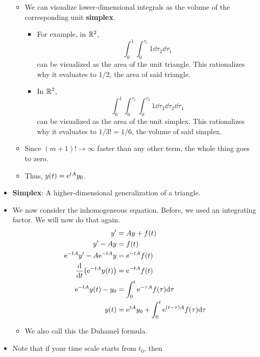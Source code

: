 \documentclass[../notes.tex]{subfiles}
\begin{document}
\begin{itemize}
\begin{itemize}
\begin{itemize}
        \end{itemize}
        \item We can visualize lower-dimensional integrals as the volume of the corresponding unit \textbf{simplex}.
        \begin{itemize}
            \item For example, in $\R^2$,
            \begin{equation*}
                \int_0^1\int_0^{\tau_1}1\dd\tau_2\dd{\tau_1}
            \end{equation*}
            can be visualized as the area of the unit triangle. This rationalizes why it evaluates to $1/2$, the area of said triangle.
            \item In $\R^3$,
            \begin{equation*}
                \int_0^1\int_0^{\tau_1}\int_0^{\tau_2}1\dd\tau_3\dd\tau_2\dd{\tau_1}
            \end{equation*}
            can be visualized as the area of the unit simplex. This rationalizes why it evaluates to $1/3!=1/6$, the volume of said simplex.
        \end{itemize}
        \item Since $(m+1)!\to\infty$ faster than any other term, the whole thing goes to zero.
        \item Thus, $y(t)=\e[tA]y_0$.
    \end{itemize}
    \item \textbf{Simplex}: A higher-dimensional generalization of a triangle.
    \item We now consider the inhomogeneous equation. Before, we used an integrating factor. We will now do that again.
    \begin{align*}
        y' &= Ay+f(t)\\
        y'-Ay &= f(t)\\
        \e[-tA]y'-A\e[-tA]y &= \e[-tA]f(t)\\
        \dv{t}(\e[-tA]y(t)) &= \e[-tA]f(t)\\
        \e[-tA]y(t)-y_0 &= \int_0^t\e[-\tau A]f(\tau)\dd\tau\\
        y(t) &= \e[tA]y_0+\int_0^t\e[(t-\tau)A]f(\tau)\dd\tau
    \end{align*}
    \begin{itemize}
        \item We also call this the Duhamel formula.
    \end{itemize}
    \item Note that if your time scale starts from $t_0$, then

\end{itemize}
\end{document}
